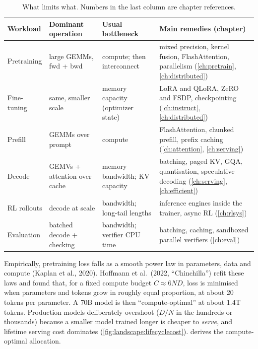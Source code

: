 \begin{table}[t]
\centering\small
\begin{tabularx}{\linewidth}{lllX}
\toprule
Workload & Dominant operation & Usual bottleneck & Main remedies (chapter)\\
\midrule
Pretraining & large GEMMs, fwd + bwd & compute; then interconnect & mixed precision, kernel fusion, Flash\-Attention, parallelism (\ref{ch:pretrain}, \ref{ch:distributed})\\
Fine-tuning & same, smaller scale & memory capacity (optimizer state) & LoRA and QLoRA, ZeRO and FSDP, checkpointing (\ref{ch:instruct}, \ref{ch:distributed})\\
Prefill & GEMMs over prompt & compute & FlashAttention, chunked prefill, prefix caching (\ref{ch:attention}, \ref{ch:serving})\\
Decode & GEMVs + attention over cache & memory bandwidth; KV capacity & batching, paged KV, GQA, quantisation, speculative decoding (\ref{ch:serving}, \ref{ch:efficient})\\
RL rollouts & decode at scale & bandwidth; long-tail lengths & inference engines inside the trainer, async RL (\ref{ch:rlsys})\\
Evaluation & batched decode + checking & bandwidth; verifier CPU time & batching, caching, sandboxed parallel verifiers (\ref{ch:eval})\\
\bottomrule
\end{tabularx}
\caption{What limits what. Numbers in the last column are chapter references.}
\label{tab:landscape:bottlenecks}
\end{table}

\begin{deepdive}
Empirically, pretraining loss falls as a smooth power law in parameters, data and compute
(Kaplan et al., 2020). Hoffmann et al.\ (2022, ``Chinchilla'') refit these laws and found that, for a
fixed compute budget $C\approx6ND$, loss is minimised when parameters and tokens grow in roughly equal
proportion, at about 20 tokens per parameter. A 70B model is then ``compute-optimal'' at about 1.4T
tokens. Production models deliberately overshoot ($D/N$ in the hundreds or thousands) because a smaller
model trained longer is cheaper to \emph{serve}, and lifetime serving cost dominates
(\cref{fig:landscape:lifecyclecost}).  derives the compute-optimal allocation.
\end{deepdive}

